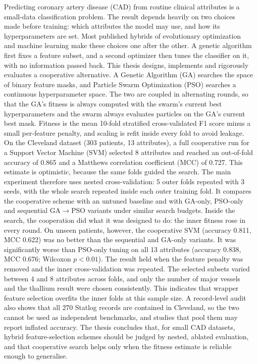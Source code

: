 \documentclass[MTech]{ugthesis}
\begin{document}
\abstract
\begin{doublespacing}
\normalfont
{\noindent
Predicting coronary artery disease (CAD) from routine clinical attributes is a small-data classification problem. The result depends heavily on two choices made before training: which attributes the model may use, and how its hyperparameters are set. Most published hybrids of evolutionary optimization and machine learning make these choices one after the other. A genetic algorithm first fixes a feature subset, and a second optimizer then tunes the classifier on it, with no information passed back. This thesis designs, implements and rigorously evaluates a cooperative alternative. A Genetic Algorithm (GA) searches the space of binary feature masks, and Particle Swarm Optimization (PSO) searches a continuous hyperparameter space. The two are coupled in alternating rounds, so that the GA's fitness is always computed with the swarm's current best hyperparameters and the swarm always evaluates particles on the GA's current best mask. Fitness is the mean 10-fold stratified cross-validated F1 score minus a small per-feature penalty, and scaling is refit inside every fold to avoid leakage. On the Cleveland dataset (303 patients, 13 attributes), a full cooperative run for a Support Vector Machine (SVM) selected 8 attributes and reached an out-of-fold accuracy of 0.865 and a Matthews correlation coefficient (MCC) of 0.727. This estimate is optimistic, because the same folds guided the search. The main experiment therefore uses nested cross-validation: 5 outer folds repeated with 3 seeds, with the whole search repeated inside each outer training fold. It compares the cooperative scheme with an untuned baseline and with GA-only, PSO-only and sequential GA$\rightarrow$PSO variants under similar search budgets. Inside the search, the cooperation did what it was designed to do: the inner fitness rose in every round. On unseen patients, however, the cooperative SVM (accuracy 0.811, MCC 0.622) was no better than the sequential and GA-only variants. It was significantly worse than PSO-only tuning on all 13 attributes (accuracy 0.838, MCC 0.676; Wilcoxon $p<0.01$). The result held when the feature penalty was removed and the inner cross-validation was repeated. The selected subsets varied between 4 and 8 attributes across folds, and only the number of major vessels and the thallium result were chosen consistently. This indicates that wrapper feature selection overfits the inner folds at this sample size. A record-level audit also shows that all 270 Statlog records are contained in Cleveland, so the two cannot be used as independent benchmarks, and studies that pool them may report inflated accuracy. The thesis concludes that, for small CAD datasets, hybrid feature-selection schemes should be judged by nested, ablated evaluation, and that cooperative search helps only when the fitness estimate is reliable enough to generalise.
}
\end{doublespacing}
\end{document}
